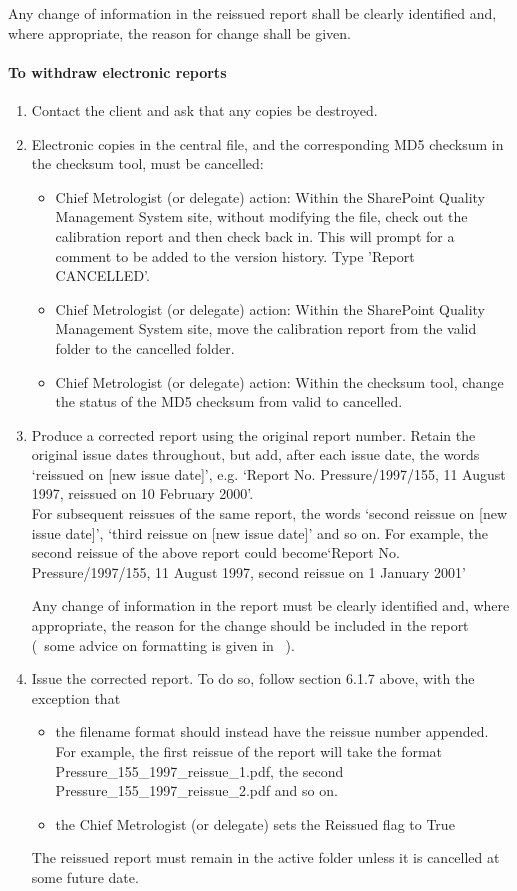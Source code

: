 Any change of information in the reissued report shall be clearly identified and, where appropriate, the reason for change shall be given.

\paragraph{To withdraw electronic reports}
\begin{enumerate}
\item Contact the client and ask that any copies be destroyed. 

\item Electronic copies in the central file, and the corresponding MD5 checksum in the checksum tool, must be cancelled:
\begin{itemize}
\item Chief Metrologist (or delegate) action:  Within the SharePoint Quality Management System site, without modifying the file, check out the calibration report and then check back in.  This will prompt for a comment to be added to the version history.  Type 'Report CANCELLED'.
\item Chief Metrologist (or delegate) action:  Within the SharePoint Quality Management System site, move the calibration report from the valid folder to the cancelled folder.
\item Chief Metrologist (or delegate) action:  Within the checksum tool, change the status of the MD5 checksum from valid to cancelled.
\end{itemize}
\item Produce a corrected report using the original report number.  Retain the original issue dates throughout, but add, after each issue date, the words `reissued on [new issue date]', e.g. `Report No. Pressure/1997/155, 11 August 1997, reissued on 10 February 2000'.\\

For subsequent reissues of the same report, the words `second reissue on [new issue date]', `third reissue on [new issue date]' and so on.  For example, the second reissue of the above report could become`Report No. Pressure/1997/155, 11 August 1997, second reissue on 1 January 2001'

Any change of information in the report must be clearly identified and, where appropriate, the reason for the change should be included in the report (~some advice on formatting is given in \cite[\S\ref*{GRP-ss:reissued_reports}]{MSL_Reporting_Guidelines}~).

\item Issue the corrected report.  To do so, follow section 6.1.7 above, with the exception that 
\begin{itemize}
\item the filename format should instead have the reissue number appended. For example, the first reissue of the report will take the format Pressure\_155\_1997\_reissue\_1.pdf, the second Pressure\_155\_1997\_reissue\_2.pdf and so on.
\item the Chief Metrologist (or delegate) sets the Reissued flag to True
\end{itemize}
The reissued report must remain in the active folder unless it is cancelled at some future date.


\end{enumerate}
